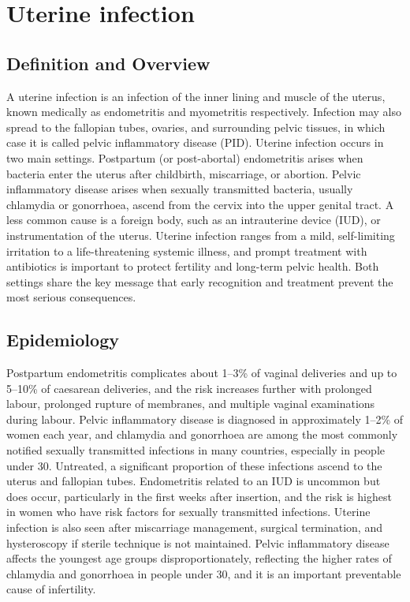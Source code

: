 \chapter{Uterine infection}

\section*{Definition and Overview}
A uterine infection is an infection of the inner lining and muscle of the uterus, known medically as endometritis and myometritis respectively. Infection may also spread to the fallopian tubes, ovaries, and surrounding pelvic tissues, in which case it is called pelvic inflammatory disease (PID). Uterine infection occurs in two main settings. Postpartum (or post-abortal) endometritis arises when bacteria enter the uterus after childbirth, miscarriage, or abortion. Pelvic inflammatory disease arises when sexually transmitted bacteria, usually chlamydia or gonorrhoea, ascend from the cervix into the upper genital tract. A less common cause is a foreign body, such as an intrauterine device (IUD), or instrumentation of the uterus. Uterine infection ranges from a mild, self-limiting irritation to a life-threatening systemic illness, and prompt treatment with antibiotics is important to protect fertility and long-term pelvic health. Both settings share the key message that early recognition and treatment prevent the most serious consequences.

\section*{Epidemiology}
Postpartum endometritis complicates about 1--3\% of vaginal deliveries and up to 5--10\% of caesarean deliveries, and the risk increases further with prolonged labour, prolonged rupture of membranes, and multiple vaginal examinations during labour. Pelvic inflammatory disease is diagnosed in approximately 1--2\% of women each year, and chlamydia and gonorrhoea are among the most commonly notified sexually transmitted infections in many countries, especially in people under 30. Untreated, a significant proportion of these infections ascend to the uterus and fallopian tubes. Endometritis related to an IUD is uncommon but does occur, particularly in the first weeks after insertion, and the risk is highest in women who have risk factors for sexually transmitted infections. Uterine infection is also seen after miscarriage management, surgical termination, and hysteroscopy if sterile technique is not maintained. Pelvic inflammatory disease affects the youngest age groups disproportionately, reflecting the higher rates of chlamydia and gonorrhoea in people under 30, and it is an important preventable cause of infertility.


